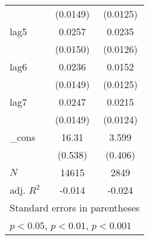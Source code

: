 {\begin{tabular}{l*{2}{c}}
            &    (0.0149)         &    (0.0125)         \\
[1em]
lag5        &      0.0257         &      0.0235         \\
            &    (0.0150)         &    (0.0126)         \\
[1em]
lag6        &      0.0236         &      0.0152         \\
            &    (0.0149)         &    (0.0125)         \\
[1em]
lag7        &      0.0247         &      0.0215         \\
            &    (0.0149)         &    (0.0124)         \\
[1em]
\_cons      &       16.31\sym{***}&       3.599\sym{***}\\
            &     (0.538)         &     (0.406)         \\
\hline
\(N\)       &       14615         &        2849         \\
adj. \(R^{2}\)&      -0.014         &      -0.024         \\
\hline\hline
\multicolumn{3}{l}{\footnotesize Standard errors in parentheses}\\
\multicolumn{3}{l}{\footnotesize \sym{*} \(p<0.05\), \sym{**} \(p<0.01\), \sym{***} \(p<0.001\)}\\
\end{tabular}
}
